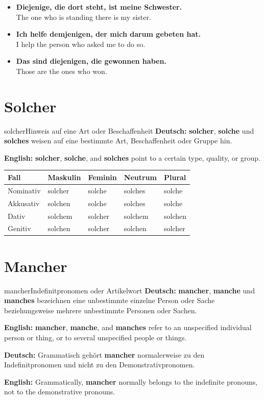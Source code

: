 \documentclass[a4paper,11pt]{article}
\newcommand{\GermanText}[1]{\textbf{Deutsch: }#1\par}
\newcommand{\EnglishText}[1]{{\small\color{SoftGray}\textbf{English: }#1\par}}
\newcommand{\ExampleItem}[2]{\item \textbf{#1}\\{\small\color{SoftGray}#2}}
\newcommand{\HeaderRow}{\rowcolor{HeaderBlueDark}\color{white}\bfseries Fall & \color{white}\bfseries Maskulin & \color{white}\bfseries Feminin & \color{white}\bfseries Neutrum & \color{white}\bfseries Plural \\}
\begin{document}
\begin{exbox}
\begin{itemize}
\ExampleItem{Diejenige, die dort steht, ist meine Schwester.}{The one who is standing there is my sister.}
\ExampleItem{Ich helfe demjenigen, der mich darum gebeten hat.}{I help the person who asked me to do so.}
\ExampleItem{Das sind diejenigen, die gewonnen haben.}{Those are the ones who won.}
\end{itemize}
\end{exbox}

\section{Solcher}
\begin{grammarentry}{solcher}{Hinweis auf eine Art oder Beschaffenheit}
\GermanText{\textbf{solcher}, \textbf{solche} und \textbf{solches} weisen auf eine bestimmte Art, Beschaffenheit oder Gruppe hin.}
\EnglishText{\textbf{solcher}, \textbf{solche}, and \textbf{solches} point to a certain type, quality, or group.}
\end{grammarentry}

\begin{center}
\begin{tabular}{|>{\centering\arraybackslash}m{2.2cm}|>{\centering\arraybackslash}m{2.5cm}|>{\centering\arraybackslash}m{2.5cm}|>{\centering\arraybackslash}m{2.5cm}|>{\centering\arraybackslash}m{2.5cm}|}
\hline
\HeaderRow
\hline
\rowcolor{RowBlueLight}Nominativ & solcher & solche & solches & solche \\
\hline
\rowcolor{RowBlueDark}Akkusativ & solchen & solche & solches & solche \\
\hline
\rowcolor{RowBlueLight}Dativ & solchem & solcher & solchem & solchen \\
\hline
\rowcolor{RowBlueDark}Genitiv & solchen & solcher & solchen & solcher \\
\hline
\end{tabular}
\end{center}

\section{Mancher}
\begin{grammarentry}{mancher}{Indefinitpronomen oder Artikelwort}
\GermanText{\textbf{mancher}, \textbf{manche} und \textbf{manches} bezeichnen eine unbestimmte einzelne Person oder Sache beziehungsweise mehrere unbestimmte Personen oder Sachen.}
\EnglishText{\textbf{mancher}, \textbf{manche}, and \textbf{manches} refer to an unspecified individual person or thing, or to several unspecified people or things.}
\GermanText{Grammatisch gehört \textbf{mancher} normalerweise zu den Indefinitpronomen und nicht zu den Demonstrativpronomen.}
\EnglishText{Grammatically, \textbf{mancher} normally belongs to the indefinite pronouns, not to the demonstrative pronouns.}
\end{grammarentry}
\end{document}
